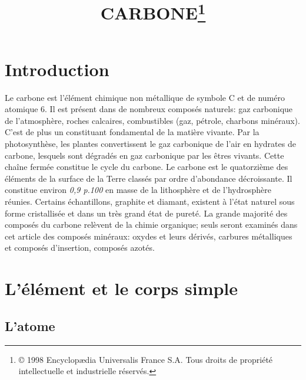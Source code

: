\documentclass[]{article}
\title{CARBONE\footnote{© 1998 Encyclopædia Universalis France S.A. Tous droits de
propriété intellectuelle et industrielle réservés.}}
\date{}
\begin{document}
\rhead{}

\maketitle \newpage

\tableofcontents \newpage

\section{Introduction} 

Le carbone est l'élément chimique non métallique de symbole C
et de numéro atomique 6. Il est présent dans de nombreux
composés naturels: gaz carbonique de l'atmosphère, roches
calcaires, combustibles (gaz, pétrole, charbons minéraux). C'est
de plus un constituant fondamental de la matière vivante. Par la
photosynthèse, les plantes convertissent le gaz carbonique de l'air
en hydrates de carbone, lesquels sont dégradés en gaz carbonique
par les êtres vivants. Cette chaîne fermée constitue le cycle
du carbone.  Le carbone est le quatorzième des éléments de la
surface de la Terre classés par ordre d'abondance
décroissante. Il constitue environ \textit{0,9 p.100} en masse de la
lithosphère et de l'hydrosphère réunies. Certains
échantillons, graphite et diamant, existent à l'état naturel
sous forme cristallisée et dans un très grand état de
pureté. La grande majorité des composés du carbone
relèvent de la chimie organique; seuls seront examinés dans cet
article des composés minéraux: oxydes et leurs dérivés,
carbures métalliques et composés d'insertion, composés
azotés.  


\section{L'élément et le corps simple} 

\subsection{L'atome} 
\end{document}
